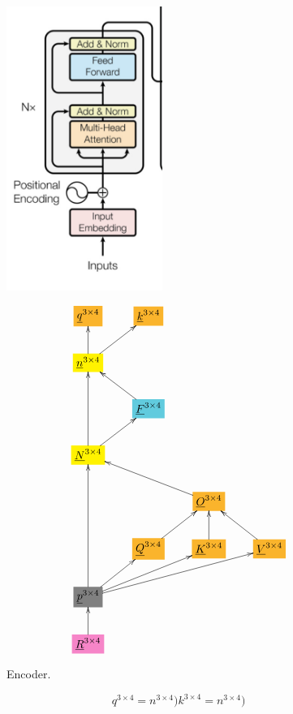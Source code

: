 \documentclass[12pt]{article}
\begin{document}
\begin{figure}[h!]\centering
\begin{minipage}{.5\linewidth}
\includegraphics[width=2in]{encoder.jpg}
\end{minipage}%
\begin{minipage}{.5\linewidth}
$$\xymatrix{
*+[F*:Dandelion]{\underline{q}^{3\times  4}}&*+[F*:Dandelion]{\underline{k}^{3\times  4}}&&
\\
*+[F*:yellow]{\underline{n}^{3\times  4}}\ar[u]\ar[ur]&&&
\\
&*+[F*:SkyBlue]{\underline{F}^{3\times  4}}\ar[ul]&&
\\
*+[F*:yellow]{\underline{N}^{3\times  4}}\ar[uu]\ar[ur]&&&
\\
&&*+[F*:Dandelion]{\underline{O}^{3\times  4}}\ar[ull]&
\\
&*+[F*:Dandelion]{\underline{Q}^{3\times  4}}\ar[ur]&*+[F*:Dandelion]{\underline{K}^{3\times  4}}\ar[u]&*+[F*:Dandelion]{\underline{V}^{3\times  4}}\ar[ul]
\\
*+[F*:gray]{\underline{p}^{3\times  4}}\ar[uuu]\ar[ur]\ar[urr]\ar[urrr]&&&
\\
*+[F*:Lavender]{\underline{R}^{3\times  4}}\ar[u]&&&
}$$
\end{minipage}
\caption{Encoder.}
\label{fig-texnn-for-encoder}
\end{figure}\begin{subequations}
\begin{equation}
q^{3\times  4} = n^{3\times  4})
\label{eq-q-fun-encoder}
\end{equation}

\begin{equation}
k^{3\times  4} = n^{3\times  4})
\label{eq-k-fun-encoder}
\end{equation}


\end{subequations}
\end{document}
